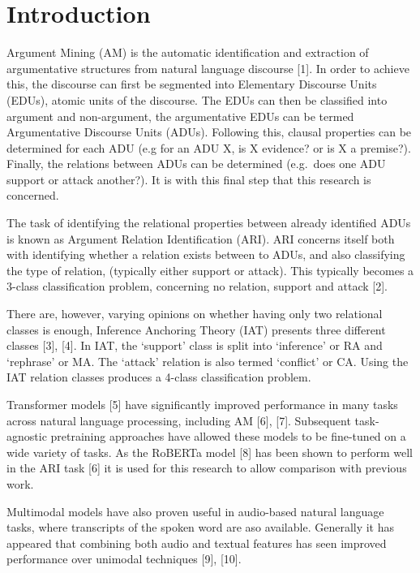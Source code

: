 \hypertarget{introduction}{%
\section{Introduction}\label{introduction}}

Argument Mining (AM) is the automatic identification and extraction of
argumentative structures from natural language discourse {[}1{]}. In
order to achieve this, the discourse can first be segmented into
Elementary Discourse Units (EDUs), atomic units of the discourse. The
EDUs can then be classified into argument and non-argument, the
argumentative EDUs can be termed Argumentative Discourse Units (ADUs).
Following this, clausal properties can be determined for each ADU (e.g
for an ADU X, is X evidence? or is X a premise?). Finally, the relations
between ADUs can be determined (e.g.~does one ADU support or attack
another?). It is with this final step that this research is concerned.

The task of identifying the relational properties between already
identified ADUs is known as Argument Relation Identification (ARI). ARI
concerns itself both with identifying whether a relation exists between
to ADUs, and also classifying the type of relation, (typically either
support or attack). This typically becomes a 3-class classification
problem, concerning no relation, support and attack {[}2{]}.

There are, however, varying opinions on whether having only two
relational classes is enough, Inference Anchoring Theory (IAT) presents
three different classes {[}3{]}, {[}4{]}. In IAT, the `support' class is
split into `inference' or RA and `rephrase' or MA. The `attack' relation
is also termed `conflict' or CA. Using the IAT relation classes produces
a 4-class classification problem.

Transformer models {[}5{]} have significantly improved performance in
many tasks across natural language processing, including AM {[}6{]},
{[}7{]}. Subsequent task-agnostic pretraining approaches have allowed
these models to be fine-tuned on a wide variety of tasks. As the RoBERTa
model {[}8{]} has been shown to perform well in the ARI task {[}6{]} it
is used for this research to allow comparison with previous work.

Multimodal models have also proven useful in audio-based natural
language tasks, where transcripts of the spoken word are aso available.
Generally it has appeared that combining both audio and textual features
has seen improved performance over unimodal techniques {[}9{]},
{[}10{]}.

